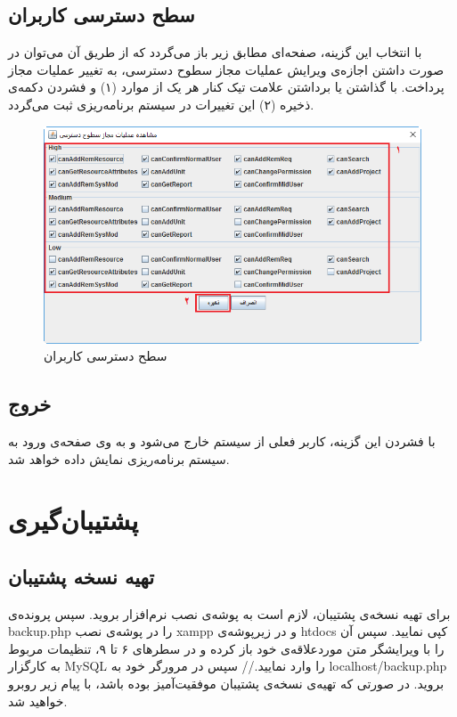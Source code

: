 \subsection{سطح دسترسی کاربران}
با انتخاب این گزینه، صفحه‌ای مطابق زیر باز می‌گردد که از طریق آن می‌توان در صورت داشتن اجازه‌ی ویرایش عملیات مجاز سطوح دسترسی، به تغییر عملیات مجاز پرداخت. با گذاشتن یا برداشتن علامت تیک کنار هر یک از موارد (۱) و فشردن دکمه‌ی ذخیره (۲) این تغییرات در سیستم برنامه‌ریزی ثبت می‌گردد.

	\begin{figure}[H]
		\centering
		\includegraphics[scale=0.7]{img/manual/ac}
		\caption{سطح دسترسی کاربران}
	\end{figure}

	
\subsection{خروج}
با فشردن این گزینه، کاربر فعلی از سیستم خارج می‌شود و به وی صفحه‌ی ورود به سیستم برنامه‌ریزی نمایش داده خواهد شد.

\section{پشتیبان‌گیری}
\subsection{تهیه نسخه پشتیبان}
برای تهیه نسخه‌ی پشتیبان، لازم است به پوشه‌ی نصب نرم‌افزار بروید. سپس پرونده‌ی  backup.php را در پوشه‌ی نصب xampp و در زیرپوشه‌ی  htdocs کپی نمایید. سپس آن را با ویرایشگر متن موردعلاقه‌ی خود باز کرده و در سطرهای ۶ تا ۹، تنظیمات مربوط به کارگزار MySQL را وارد نمایید.//
سپس در مرورگر خود به  localhost/backup.php بروید. در صورتی که تهیه‌ی نسخه‌ی پشتیبان موفقیت‌آمیز بوده باشد، با پیام زیر روبرو خواهید شد.

